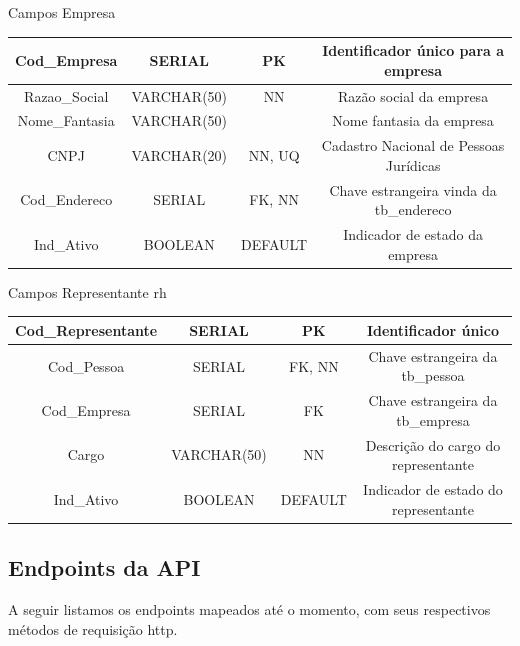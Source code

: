 \begin{quadro}[H]
	\caption{Campos Empresa}
	
	\begin{tabular}{| c | c | c | c |}
		\hline
		Cod\_Empresa   & SERIAL      & PK      & Identificador único para a empresa      \\ \hline
		Razao\_Social  & VARCHAR(50) & NN      & Razão social da empresa                 \\ \hline
		Nome\_Fantasia & VARCHAR(50) &         & Nome fantasia da empresa                \\ \hline
		CNPJ           & VARCHAR(20) & NN, UQ  & Cadastro Nacional de Pessoas Jurídicas  \\ \hline
		Cod\_Endereco  & SERIAL      & FK, NN  & Chave estrangeira vinda da tb\_endereco \\ \hline
		Ind\_Ativo     & BOOLEAN     & DEFAULT & Indicador de estado da empresa          \\ \hline
	\end{tabular}
	\label{Campos Empresa}
\end{quadro}

\begin{quadro}[H]
	\caption{Campos Representante rh}
	
	\begin{tabular}{| c | c | c | c |}
		\hline
Cod\_Representante & SERIAL      & PK      & Identificador único                \\ \hline
Cod\_Pessoa        & SERIAL      & FK, NN  & Chave estrangeira da tb\_pessoa                   \\ \hline
Cod\_Empresa       & SERIAL      & FK      & Chave estrangeira da tb\_empresa                  \\ \hline
Cargo              & VARCHAR(50) & NN      & Descrição do cargo do representante \\ \hline
Ind\_Ativo         & BOOLEAN     & DEFAULT & Indicador de estado do representante                    \\ \hline
	\end{tabular}
	\label{Campos Representante rh}
\end{quadro}


\subsection{Endpoints da API}
A seguir listamos os \glspl{endpoint} mapeados até o momento, com seus respectivos métodos de requisição \gls{http}.

